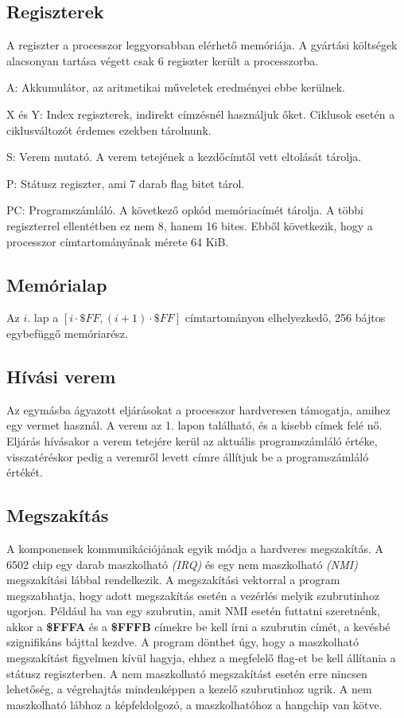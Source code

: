 \subsection{Regiszterek}
A regiszter a processzor leggyorsabban elérhető memóriája.
A gyártási költségek alacsonyan tartása végett csak 6 regiszter került a processzorba.

\begin{compactdesc}
	\item[A:] Akkumulátor, az aritmetikai műveletek eredményei ebbe kerülnek.
	\item[X és Y:] 
	Index regiszterek, indirekt címzésnél használjuk őket.
	Ciklusok esetén a ciklusváltozót érdemes ezekben tárolnunk.
	\item[S:] 
	Verem mutató. A verem tetejének a kezdőcímtől vett eltolását tárolja.
	\item[P:]
	Státusz regiszter, ami 7 darab flag bitet tárol.
	\item[PC:]
	Programszámláló. A következő opkód memóriacímét tárolja.
	A többi regiszterrel ellentétben ez nem 8, hanem 16 bites.
	Ebből következik, hogy a processzor címtartományának mérete 64 KiB.
\end{compactdesc}


\subsection{Memórialap}
Az $i$. lap a $ [i \cdot \$FF, (i+1) \cdot \$FF] $ címtartományon elhelyezkedő, 256 bájtos egybefüggő memóriarész.

\subsection{Hívási verem}
Az egymásba ágyazott eljárásokat a processzor hardveresen támogatja, amihez egy vermet használ.
A verem az 1. lapon található, és a kisebb címek felé nő.
Eljárás hívásakor a verem tetejére kerül az aktuális programszámláló értéke, 
visszatéréskor pedig a veremről levett címre állítjuk be a programszámláló értékét.

\subsection{Megszakítás}
A komponensek kommunikációjának egyik módja a hardveres megszakítás.
A 6502 chip egy darab maszkolható \emph{(IRQ)} és egy nem maszkolható \emph{(NMI)} megszakítási lábbal rendelkezik.
A megszakítási vektorral a program megszabhatja, hogy adott megszakítás esetén a vezérlés melyik szubrutinhoz ugorjon. Például ha van egy szubrutin, amit NMI esetén futtatni szeretnénk, akkor a \textbf{\$FFFA} és a \textbf{\$FFFB} címekre be kell írni a szubrutin címét, a kevésbé szignifikáns bájttal kezdve.
A program dönthet úgy, hogy a maszkolható megszakítást figyelmen kívül hagyja, ehhez a megfelelő flag-et be kell állítania a státusz regiszterben. A nem maszkolható megszakítást esetén erre nincsen lehetőség, a végrehajtás mindenképpen a kezelő szubrutinhoz ugrik.
A nem maszkolható lábhoz a képfeldolgozó, a maszkolhatóhoz a hangchip van kötve.

